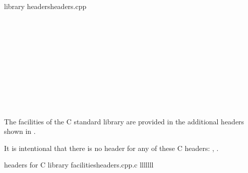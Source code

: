 \begin{multicolfloattable}{\Cpp{} library headers}{headers.cpp}
 \\
 \\
 \\
 \\
 \\
 \\
 \\
 \\
 \\
 \\
 \\
\end{multicolfloattable}

\pnum
The facilities of the C standard library are provided in the
%
additional headers shown in .%
\begin{footnote}
It is intentional that there is no \Cpp{} header
for any of these C headers:
,
.
\end{footnote}

\begin{multicolfloattable}{\Cpp{} headers for C library facilities}{headers.cpp.c}
{lllllll}
 \\
 \\
 \\
\columnbreak
{} \\
 \\
 \\
\columnbreak
{} \\
 \\
 \\
\columnbreak
{} \\
 \\
 \\
\columnbreak
{} \\
 \\
 \\
\columnbreak
{} \\
 \\
 \\
\columnbreak
{} \\
 \\
 \\
\end{multicolfloattable}

